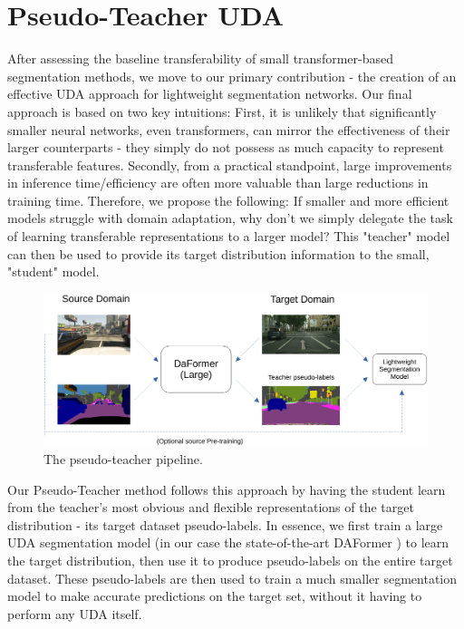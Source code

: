 \documentclass[a4paper,12pt]{report}
\begin{document}
\section{Pseudo-Teacher UDA}
After assessing the baseline transferability of small transformer-based segmentation methods, we move to our primary contribution - the creation of an effective UDA approach for lightweight segmentation networks. Our final approach is based on two key intuitions: First, it is unlikely that significantly smaller neural networks, even transformers, can mirror the effectiveness of their larger counterparts - they simply do not possess as much capacity to represent transferable features. Secondly, from a practical standpoint, large improvements in inference time/efficiency are often more valuable than large reductions in training time. Therefore, we propose the following: If smaller and more efficient models struggle with domain adaptation, why don't we simply delegate the task of learning transferable representations to a larger model? This "teacher" model can then be used to provide its target distribution information to the small, "student" model.

\begin{figure}[ht]
    \centering
    \includegraphics[width=\textwidth]{res/pseudo-teacher-pipeline.pdf}
    \caption{The pseudo-teacher pipeline.}
    \label{fig:pseudo-teacher-pipeline}
\end{figure}

Our Pseudo-Teacher method follows this approach by having the student learn from the teacher's most obvious and flexible representations of the target distribution - its target dataset pseudo-labels. In essence, we first train a large UDA segmentation model (in our case the state-of-the-art DAFormer \cite{hoyer_daformer_2022}) to learn the target distribution, then use it to produce pseudo-labels on the entire target dataset. These pseudo-labels are then used to train a much smaller segmentation model to make accurate predictions on the target set, without it having to perform any UDA itself.
\end{document}
